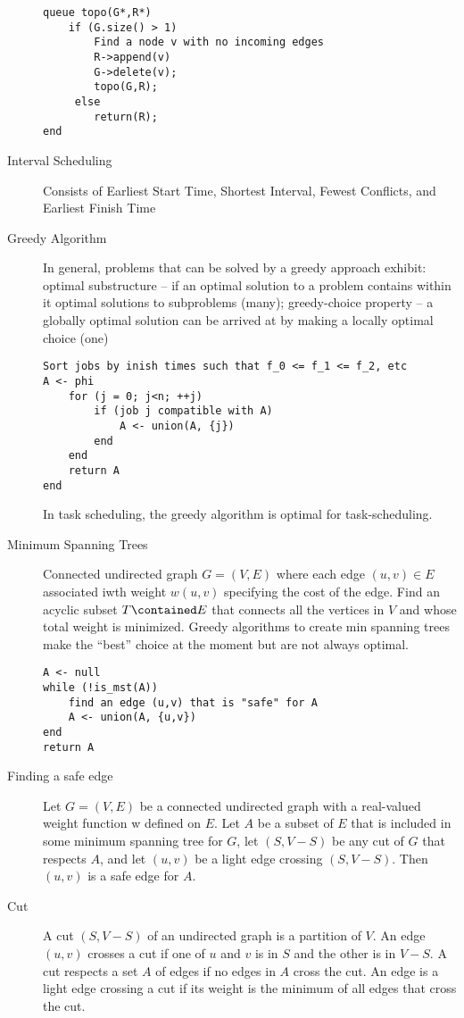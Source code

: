 \documentclass[8pt]{article}
\begin{document}
\begin{multicols}{2}
\begin{description}
\begin{verbatim}
queue topo(G*,R*)
    if (G.size() > 1)
        Find a node v with no incoming edges
        R->append(v)
        G->delete(v);
        topo(G,R);
     else
        return(R);
end
\end{verbatim}
  \item[Interval Scheduling] Consists of Earliest Start Time, Shortest
    Interval, Fewest Conflicts, and Earliest Finish Time
  \item[Greedy Algorithm] In general, problems that can be solved by a
    greedy approach exhibit: optimal substructure -- if an optimal
    solution to a problem contains within it optimal solutions to
    subproblems (many); greedy-choice property -- a globally optimal
    solution can be arrived at by making a locally optimal choice
    (one)
\begin{verbatim}
Sort jobs by inish times such that f_0 <= f_1 <= f_2, etc
A <- phi
    for (j = 0; j<n; ++j)
        if (job j compatible with A)
            A <- union(A, {j})
        end
    end
    return A
end
\end{verbatim}
In task scheduling, the greedy algorithm is optimal for task-scheduling.
\item[Minimum Spanning Trees] Connected undirected graph $G=(V,E)$
  where each edge $(u,v) \in E$ associated iwth weight $w(u,v)$
  specifying the cost of the edge. Find an acyclic subset $T
  \contained E$ that connects all the vertices in $V$ and whose total
  weight is minimized. Greedy algorithms to create min spanning trees
  make the ``best'' choice at the moment but are not always optimal.
\begin{verbatim}
A <- null
while (!is_mst(A))
    find an edge (u,v) that is "safe" for A
    A <- union(A, {u,v})
end
return A
\end{verbatim}
\item[Finding a safe edge] Let $G = (V, E)$ be a connected undirected
  graph with a real-valued weight function w defined on $E$. Let $A$
  be a subset of $E$ that is included in some minimum spanning tree
  for $G$, let $(S, V − S)$ be any cut of $G$ that respects $A$, and
  let $(u, v)$ be a light edge crossing $(S, V − S)$. Then $(u, v)$ is
  a safe edge for $A$.
\item[Cut] A cut $(S,V-S)$ of an undirected graph is a partition of
  $V$. An edge $(u,v)$ crosses a cut if one of $u$ and $v$ is in $S$
  and the other is in $V-S$. A cut respects a set $A$ of edges if no
  edges in $A$ cross the cut. An edge is a light edge crossing a cut
  if its weight is the minimum of all edges that cross the cut.
  \end{description} %
\end{multicols}
\end{document}
